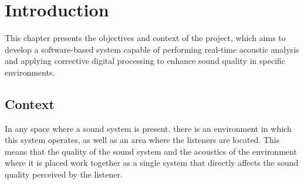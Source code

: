 \chapter{Introduction}

This chapter presents the objectives and context of the project, which aims to develop a software-based system capable of performing real-time acoustic analysis and applying corrective digital processing to enhance sound quality in specific environments.

\section{Context}


In any space where a sound system is present, there is an environment in which this system operates, as well as an area where the listeners are located. This means that the quality of the sound system and the acoustics of the environment where it is placed work together as a single system that directly affects the sound quality perceived by the listener.


